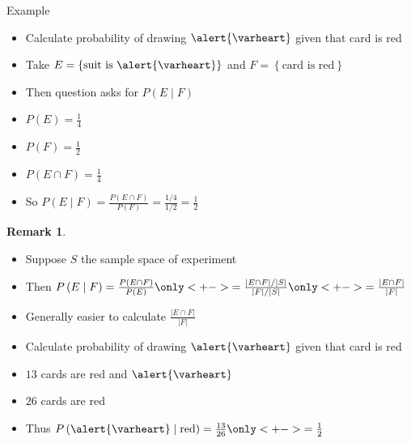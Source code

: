 \documentclass[handout]{beamer}
\theoremstyle{definition}
\newtheorem{remark}{Remark}
\begin{document}
\begin{frame}{Example}
\begin{itemize}
\item Calculate probability of drawing $\alert{\varheart}$ given
that card is red
\item Take $E=\left\{\text{suit is $\alert{\varheart}$}\right\}$
and $F=\left\{\text{card is red}\right\}$
\item Then question asks for $P\left(E\mid F\right)$
\item $P\left(E\right)=\frac{1}{4}$
\item $P\left(F\right)=\frac{1}{2}$
\item $P\left(E\cap F\right)=\frac{1}{4}$
\item So $P\left(E\mid F\right)
=\frac{P\left(E\cap F\right)}{P\left(F\right)}=\frac{1/4}{1/2}=\frac{1}{2}$
\end{itemize}
\end{frame}

\begin{frame}
\begin{remark}
\begin{itemize}
\item Suppose $S$ the sample space of experiment
\item Then
$P\left(E\mid F\right)=\frac{P\left(E\cap F\right)}{P\left(E\right)}
\only<+->{=\frac{\left|E\cap F\right|/\left|S\right|}
{\left|F\right|/\left|S\right|}}
\only<+->{=\frac{\left|E\cap F\right|}{\left|F\right|}}$
\item Generally easier to calculate
$\frac{\left|E\cap F\right|}{\left|F\right|}$
\end{itemize}
\end{remark}
\begin{example}
\begin{itemize}
\item Calculate probability of drawing $\alert{\varheart}$ given
that card is red
\item $13$ cards are red and $\alert{\varheart}$
\item $26$ cards are red
\item Thus $P\left(\alert{\varheart}\mid\text{red}\right)
=\frac{13}{26}\only<+->{=\frac{1}{2}}$
\end{itemize}
\end{example}
\end{frame}
\end{document}
